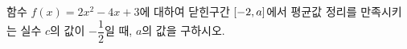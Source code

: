 함수 $f(x)=2x^2-4x+3$에 대하여 닫힌구간 $[-2{,}\mkern3mu\mathopen{}a]$에서 평균값 정리를 만족시키는 실수 $c$의 값이 $-\dfrac{1}{2}$일 때, $a$의 값을 구하시오. 
